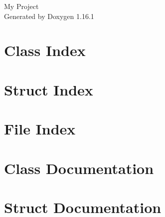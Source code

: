 \documentclass[twoside]{book}
\newcommand{\+}{\discretionary{\mbox{\scriptsize$\hookleftarrow$}}{}{}}
\newcommand{\clearemptydoublepage}{%
    \newpage{\pagestyle{empty}\cleardoublepage}%
  }
\begin{document}
  \raggedbottom
    \hypersetup{pageanchor=false,
                bookmarksnumbered=true,
                pdfencoding=unicode
               }
  \begin{titlepage}
  \vspace*{7cm}
  \begin{center}%
  {\Large My Project}\\
  \vspace*{1cm}
  {\large Generated by Doxygen 1.16.1}\\
  \end{center}
  \end{titlepage}
  \clearemptydoublepage
  \tableofcontents
  \clearemptydoublepage
  \hypersetup{pageanchor=true}

\chapter{Class Index}

\chapter{Struct Index}

\chapter{File Index}

\chapter{Class Documentation}








\chapter{Struct Documentation}








\end{document}
